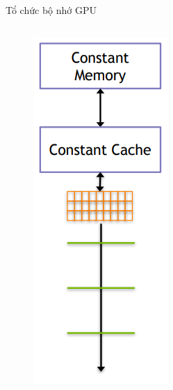 \documentclass[10pt]{beamer}
\theoremstyle{remark}
\numberwithin{algocf}{section}
\numberwithin{equation}{section}
\numberwithin{dl}{section}
\numberwithin{figure}{section}
\begin{document}
\begin{frame}{Tổ chức bộ nhớ GPU}
\begin{columns}[onlytextwidth]
\begin{column}{0.5\linewidth}
\begin{figure}[H]
                \includegraphics[width=0.6\linewidth]{figures/CUDA/GPU_Constant_Memory.png}
            \end{figure}
        \end{column}
    \end{columns}
\end{frame}
\end{document}

